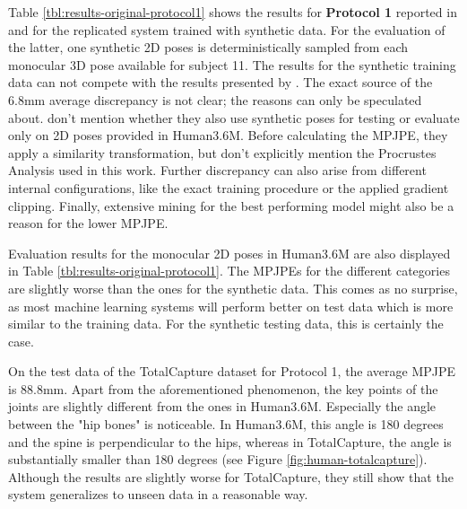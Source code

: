 



Table \ref{tbl:results-original-protocol1} shows the results for \textbf{Protocol 1} reported in \cite{drover18} and for the replicated system trained with synthetic data.
For the evaluation of the latter, one synthetic 2D poses is deterministically sampled from each monocular 3D pose available for subject 11.
The results for the synthetic training data can not compete with the results presented by \citet{drover18}.
The exact source of the 6.8mm average discrepancy is not clear; the reasons can only be speculated about.
\citet{drover18} don't mention whether they also use synthetic poses for testing or evaluate only on 2D poses provided in Human3.6M.
Before calculating the MPJPE, they apply a similarity transformation, but don't explicitly mention the Procrustes Analysis used in this work.
Further discrepancy can also arise from different internal configurations, like the exact training procedure or the applied gradient clipping.
Finally, extensive mining for the best performing model might also be a reason for the lower MPJPE.

Evaluation results for the monocular 2D poses in Human3.6M are also displayed in Table \ref{tbl:results-original-protocol1}.
The MPJPEs for the different categories are slightly worse than the ones for the synthetic data.
This comes as no surprise, as most machine learning systems will perform better on test data which is more similar to the training data.
For the synthetic testing data, this is certainly the case.

On the test data of the TotalCapture dataset for Protocol 1, the average MPJPE is 88.8mm.
Apart from the aforementioned phenomenon, the key points of the joints are slightly different from the ones in Human3.6M.
Especially the angle between the "hip bones" is noticeable.
In Human3.6M, this angle is 180 degrees and the spine is perpendicular to the hips, whereas in TotalCapture, the angle is substantially smaller than 180 degrees (see Figure \ref{fig:human-totalcapture}).
Although the results are slightly worse for TotalCapture, they still show that the system generalizes to unseen data in a reasonable way.



